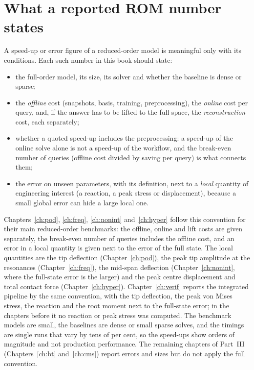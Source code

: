 \section{What a reported ROM number states}\label{sec:conv-rom}

A speed-up or error figure of a reduced-order model is meaningful only with its conditions. Each such number in this book should state:
\begin{itemize}
\item the full-order model, its size, its solver and whether the baseline is dense or sparse;
\item the \emph{offline} cost (snapshots, basis, training, preprocessing), the \emph{online} cost per query, and, if the answer has to be lifted to the full space, the \emph{reconstruction} cost, each separately;
\item whether a quoted speed-up includes the preprocessing: a speed-up of the online solve alone is not a speed-up of the workflow, and the break-even number of queries (offline cost divided by saving per query) is what connects them;
\item the error on unseen parameters, with its definition, next to a \emph{local} quantity of engineering interest (a reaction, a peak stress or displacement), because a small global error can hide a large local one.
\end{itemize}
Chapters~\ref{ch:pod}, \ref{ch:freq}, \ref{ch:nonint} and~\ref{ch:hyper} follow this convention for their main reduced-order benchmarks: the offline, online and lift costs are given separately, the break-even number of queries includes the offline cost, and an error in a local quantity is given next to the error of the full state. The local quantities are the tip deflection (Chapter~\ref{ch:pod}), the peak tip amplitude at the resonances (Chapter~\ref{ch:freq}), the mid-span deflection (Chapter~\ref{ch:nonint}, where the full-state error is the larger) and the peak centre displacement and total contact force (Chapter~\ref{ch:hyper}). Chapter~\ref{ch:verif} reports the integrated pipeline by the same convention, with the tip deflection, the peak von Mises stress, the reaction and the root moment next to the full-state error; in the chapters before it no reaction or peak stress was computed. The benchmark models are small, the baselines are dense or small sparse solves, and the timings are single runs that vary by tens of per cent, so the speed-ups show orders of magnitude and not production performance. The remaining chapters of Part~III (Chapters~\ref{ch:bt} and~\ref{ch:cms}) report errors and sizes but do not apply the full convention.
